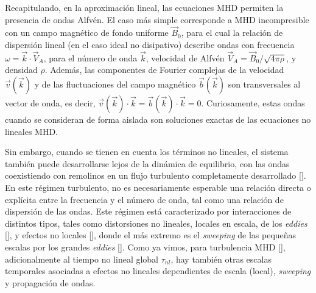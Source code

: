 Recapitulando, en la aproximación lineal, las ecuaciones MHD permiten
la presencia de ondas Alfv\'en. El caso más simple corresponde a MHD
incompresible con un campo magnético de fondo uniforme $\vec{B}_0$,
para el cual la relación de dispersión lineal (en el caso ideal no
disipativo) describe ondas con frecuencia $ \omega =
\vec{k}\cdot\vec{V}_A$, para el número de onda $\vec{k}$, velocidad de
Alfv\'en $\vec{V}_A = \vec{B}_0 / \sqrt{4\pi\rho}$, y densidad
$\rho$. Además, las componentes de Fourier complejas de la velocidad
$\vec{v}(\vec{k})$ y de las fluctuaciones del campo magnético
$\vec{b}(\vec{k})$ son transversales al vector de onda, es decir,
$\vec{v}(\vec{k}) \cdot \vec{k} = \vec{b}(\vec{k}) \cdot \vec{k} =
0$. Curiosamente, estas ondas cuando se consideran de forma aislada
son soluciones exactas de las ecuaciones no lineales MHD.

Sin embargo, cuando se tienen en cuenta los términos no lineales, el
sistema también puede desarrollarse lejos de la dinámica de
equilibrio, con las ondas coexistiendo con remolinos en un flujo
turbulento completamente desarrollado [\cite{dmitruk_waves_2009}].  En
este régimen turbulento, no es necesariamente esperable una relación
directa o explícita entre la frecuencia y el número de onda, tal como
una relación de dispersión de las ondas.  Este régimen está
caracterizado por interacciones de distintos tipos, tales como
distorsiones no lineales, locales en escala, de los \textit{eddies}
[\cite{monin_statistical_2013, kolmogorov_local_1941,
    mccomb_physics_1992}], y efectos no locales
[\cite{alexakis_turbulent_2007, alexakis_anisotropic_2007,
    teaca_energy_2009, mininni_scale_2011}], donde el más extremo es
el \textit{sweeping} de las pequeñas escalas por los grandes
\textit{eddies} [\cite{kraichnan_structure_1959,
    tennekes_eulerian_1975, chen_sweeping_1989, nelkin_time_1990}].
Como ya vimos, para turbulencia MHD [\cite{pouquet_strong_1976,
    zhou_magnetohydrodynamic_2004}], adicionalmente al tiempo no
lineal global $\tau_{nl}$, hay también otras escalas temporales
asociadas a efectos no lineales dependientes de escala (local),
\textit{sweeping} y propagación de ondas.

